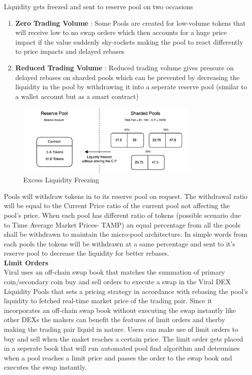 \documentclass[conference]{IEEEtran}
\begin{document}
Liquidity gets freezed and sent to reserve pool on two occasions
\begin{enumerate}[wide, labelwidth=!, labelindent=0pt]
\item \textbf{Zero Trading Volume} : Some Pools are created for low-volume tokens that will receive low to no swap orders which then accounts for a huge price impact if the value suddenly sky-rockets making the pool to react differently to price impacts and delayed rebases
\item \textbf{Reduced Trading Volume} : Reduced trading volume gives pressure on delayed rebases on sharded pools which can be prevented by decreasing the liquidity in the pool by withdrawing it into a seperate reserve pool (similar to a wallet account but as a smart contract) 
\end{enumerate}

\begin{figure}[H]
\begin{center}
\includegraphics[width=9cm]{reserve-pool-2}
\caption{Excess Liquidity Freezing}
\end{center}
\end{figure}

Pools will withdraw tokens in to its reserve pool on request. The withdrawal ratio will be equal to the Current Price ratio of the current pool not affecting the pool's price. When each pool has different ratio of tokens (possible scenario due to Time Average Market Prices- TAMP) an equal percentage from all the pools shall be withdrawn to maintain the micro-pool architecture. In simple words from each pools the tokens will be withdrawn at a same percentage and sent to it's reserve pool to decrease the liquidity for better rebases.\\


\textbf{Limit Orders}\\

Viral uses an off-chain swap book that matches the summation of primary coin/secondary coin buy and sell orders to execute a swap in the Viral DEX Liquidity Pools that sets a pricing strategy in accordance with rebasing the pool's liquidity to fetched real-time market price of the trading pair. Since it incorporates an off-chain swap book without executing the swap instantly like other DEXs the makers can benefit the features of limit orders and therby making the trading pair liquid in nature. Users can make use of limit orders to buy and sell when the maket reaches a certain price. The limit order gets placed in a seperate book that will run automated pool find algorithm and determines when a pool reaches a limit price and passes the order to the swap book and executes the swap instantly.\\
\end{document}
